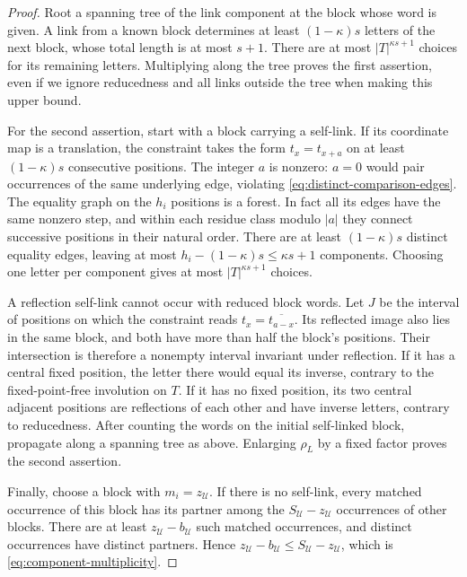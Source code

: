 \begin{proof}
Root a spanning tree of the link component at the block whose word is
given.  A link from a known block determines at least $(1-\kappa)s$
letters of the next block, whose total length is at most $s+1$.
There are at most $|T|^{\kappa s+1}$ choices for its remaining letters.
Multiplying along the tree proves the first assertion, even if we
ignore reducedness and all links outside the tree when making this
upper bound.

For the second assertion, start with a block carrying a self-link.
If its coordinate map is a translation, the constraint takes the form
$t_x=t_{x+a}$ on at least $(1-\kappa)s$ consecutive positions.  The
integer $a$ is nonzero: $a=0$ would pair occurrences of the same
underlying edge, violating \eqref{eq:distinct-comparison-edges}.
The equality graph on the $h_i$ positions is a forest.  In fact all its
edges have the same nonzero step, and within each residue class modulo
$|a|$ they connect successive positions in their natural order.
There are at least $(1-\kappa)s$ distinct equality edges, leaving at
most $h_i-(1-\kappa)s\leq\kappa s+1$ components.  Choosing one letter
per component gives at most $|T|^{\kappa s+1}$ choices.

A reflection self-link cannot occur with reduced block words.  Let
$J$ be the interval of positions on which the constraint reads
$t_x=\overline{t_{a-x}}$.  Its reflected image also lies in the same
block, and both have more than half the block's positions.
Their intersection is therefore a nonempty interval invariant under
reflection.  If it has a central fixed position, the letter there
would equal its inverse, contrary to the fixed-point-free involution
on $T$.  If it has no fixed position, its two central adjacent positions
are reflections of each other and have inverse letters, contrary to
reducedness.  After counting the words on the initial self-linked
block, propagate along a spanning tree as above.  Enlarging $\rho_L$
by a fixed factor proves the second assertion.

Finally, choose a block with $m_i=z_{\mathcal U}$.  If there is no
self-link, every matched occurrence of this block has its partner
among the $S_{\mathcal U}-z_{\mathcal U}$ occurrences of other blocks.
There are at least $z_{\mathcal U}-b_{\mathcal U}$ such matched
occurrences, and distinct occurrences have distinct partners.  Hence
$z_{\mathcal U}-b_{\mathcal U}\leq
S_{\mathcal U}-z_{\mathcal U}$, which is
\eqref{eq:component-multiplicity}.
\end{proof}

